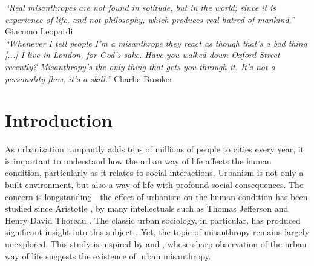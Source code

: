 \documentclass[11pt, letterpaper]{article}
\newcommand{\emd}[1]{\ExecuteMetaData[/tmp/tex]{#1}} %
\begin{document}

\begin{spacing}{1.4} %
\vspace{.25in}


{\small\it \noindent ``Real misanthropes are not found in solitude, but in the world; since it is experience of life, and not philosophy, which produces real hatred of mankind.''} Giacomo Leopardi\\

{\small\it \noindent ``Whenever I tell people I'm a misanthrope they react as
  though that's a bad thing [...] I live in London, for God's sake. Have you
  walked down Oxford Street recently? Misanthropy's the only thing that gets you
  through it. It's not a personality flaw, it's a skill.''} Charlie Brooker\\


\newpage

\section*{Introduction}

\noindent As urbanization rampantly adds tens of millions of people to cities every year, it is important to understand how the urban way of life affects the human condition, particularly as it relates to social interactions.
 Urbanism is not only a built environment, but also a way of life with profound social consequences. 
The concern is longstanding---the effect of urbanism on the human condition has
been studied since Aristotle \citep{jowett1920aristotle}, by many intellectuals
such as Thomas Jefferson and Henry David Thoreau \citep{white77}. The classic urban sociology, in particular, has produced significant insight into this subject \citep{wirth38,tonnies57,simmel03}. Yet, the topic of misanthropy  remains largely unexplored. This study is inspired by \citet{amin06} and \citet{thrift05}, whose sharp observation of
the urban way of life suggests the existence of urban misanthropy. 


\end{spacing}
\end{document}
